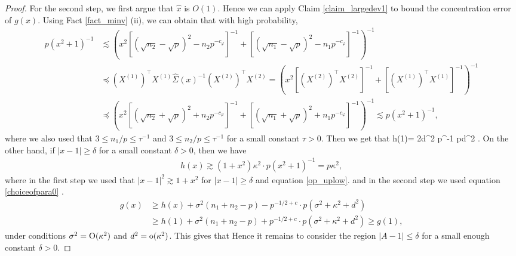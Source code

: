 \begin{proof}



For the second step, we first argue that $\hat{x}$ is $O(1)$. Hence we can apply Claim \ref{claim_largedev1} to bound the concentration error of $g(x)$.
Using Fact \ref{fact_minv} (ii), we can obtain that with high probability,
\begin{align}
p(x^2+1)^{-1}&\lesssim \left( x^2 \left[(\sqrt{n_2}-\sqrt{p})^{2}-n_2p^{-c_\varphi}\right]^{-1} +\left[(\sqrt{n_1}-\sqrt{p})^{2}-n_1p^{-c_\varphi}\right]^{-1} \right)^{-1} \nonumber\\
&\preceq (X^{(1)})^\top X^{(1)} \hat\Sigma(x)^{-1}(X^{(2)})^\top X^{(2)} =\left( x^2 [(X^{(2)})^\top X^{(2)}]^{-1} + [(X^{(1)})^\top X^{(1)}]^{-1} \right)^{-1} \nonumber\\
&\preceq \left( x^2 \left[(\sqrt{n_2}+\sqrt{p})^{2}+n_2p^{-c_\varphi}\right]^{-1} +\left[(\sqrt{n_1}+\sqrt{p})^{2}+n_1p^{-c_\varphi}\right]^{-1} \right)^{-1}\lesssim p(x^2+1)^{-1}, \label{op_uplow}
\end{align}
where we also used that $3\le n_1/p \le \tau^{-1}$ and $3\le  n_2/p \le \tau^{-1}$ for a small constant $\tau>0$. Then we get that
\be\label{eq_h1}h(1)= 2d^2 \cdot p^{-1} \tr{}\lesssim pd^2 .\ee
On the other hand, if $|x-1|\ge \delta$ for a small constant $\delta>0$, then we have
\begin{align}\label{eq_hA}
h(x)\gtrsim (1+x^2)\kappa^2 \cdot p\left( x^2 +1\right)^{-1} =p\kappa^2 ,
\end{align}
where in the first step we used that $|x-1|^2\gtrsim 1+x^2$ for $|x-1|\ge \delta$ and equation \eqref{op_uplow}.
and in the second step we used equation \eqref{choiceofpara0} .
\begin{align}
g(x)&\ge  h(x) +\sigma^2(n_1+n_2-p) -p^{-1/2+c}\cdot p\left(\sigma^2 +\kappa^2+d^2 \right) \nonumber\\
&\ge h(1) +\sigma^2(n_1+n_2-p) + p^{-1/2+c}\cdot p\left(\sigma^2 +\kappa^2+d^2 \right) \ge g(1), \label{gA>g1}
\end{align}
under conditions $\sigma^2 =\operatorname{O}( \kappa^2)$ and $d^2 =\operatorname{o}({\kappa^2})$. %
This gives that
Hence it remains to consider the region $|A-1|\le \delta$ for a small enough constant $\delta>0$.





\end{proof}

